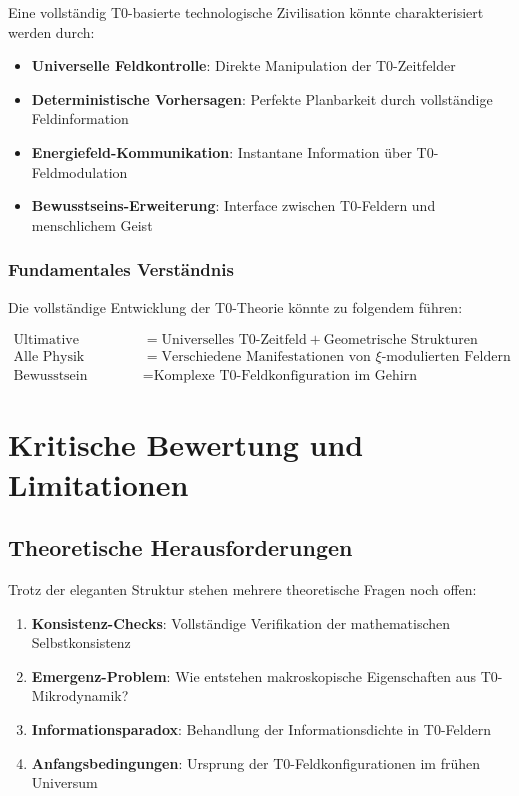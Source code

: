 \documentclass[12pt,a4paper]{article}
\begin{document}
	Eine vollständig T0-basierte technologische Zivilisation könnte charakterisiert werden durch:
	
	\begin{itemize}
		\item \textbf{Universelle Feldkontrolle}: Direkte Manipulation der T0-Zeitfelder
		\item \textbf{Deterministische Vorhersagen}: Perfekte Planbarkeit durch vollständige Feldinformation
		\item \textbf{Energiefeld-Kommunikation}: Instantane Information über T0-Feldmodulation
		\item \textbf{Bewusstseins-Erweiterung}: Interface zwischen T0-Feldern und menschlichem Geist
	\end{itemize}
	
	\subsubsection{Fundamentales Verständnis}
	
	Die vollständige Entwicklung der T0-Theorie könnte zu folgendem führen:
	
	\begin{align}
		\text{Ultimative Realität} &= \text{Universelles T0-Zeitfeld} + \text{Geometrische Strukturen} \\
		\text{Alle Physik} &= \text{Verschiedene Manifestationen von } \xi\text{-modulierten Feldern} \\
		\text{Bewusstsein} &= \text{Komplexe T0-Feldkonfiguration im Gehirn}
	\end{align}
	
	\section{Kritische Bewertung und Limitationen}
	
	\subsection{Theoretische Herausforderungen}
	
	Trotz der eleganten Struktur stehen mehrere theoretische Fragen noch offen:
	
	\begin{enumerate}
		\item \textbf{Konsistenz-Checks}: Vollständige Verifikation der mathematischen Selbstkonsistenz
		\item \textbf{Emergenz-Problem}: Wie entstehen makroskopische Eigenschaften aus T0-Mikrodynamik?
		\item \textbf{Informationsparadox}: Behandlung der Informationsdichte in T0-Feldern
		\item \textbf{Anfangsbedingungen}: Ursprung der T0-Feldkonfigurationen im frühen Universum
	\end{enumerate}
	
\end{document}
